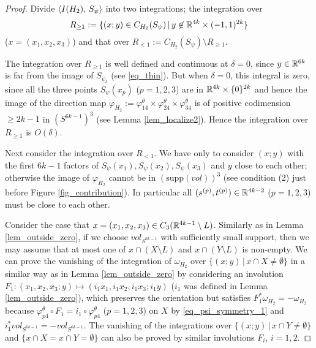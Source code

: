 \begin{proof}
Divide $\langle {I(H_2 )},\, {S_{\psi}}\rangle$ into two integrations;
the integration over
\[
 R_{\ge 1}:=\{ (x;y) \in C_{H_2}(S_{\psi}) \, | \, y \not\in \mathbb{R}^{4k}\times (-1,1)^{2k}\}
\]
($x=(x_1 ,x_2 ,x_3 )$) and that over $R_{<1}:=C_{H_2}(S_{\psi}) \setminus R_{\ge 1}$.


The integration over $R_{\ge 1}$ is well defined and continuous at $\delta =0$, since $y\in \mathbb{R}^{6k}$ is
far from the image of $S_{\psi_{\delta}}$ (see \eqref{eq_thin}).
But when $\delta =0$, this integral is zero, since all the three points $S_{\psi}(x_p )$ ($p=1,2,3$) are in
$\mathbb{R}^{4k}\times \{ 0 \}^{2k}$ and hence the image of the direction map
$\varphi_{H_2}:=\varphi^{\theta}_{14}\times \varphi^{\theta}_{24}\times \varphi^{\theta}_{34}$ is of positive codimension
$\ge 2k-1$ in $(S^{6k-1})^3$ (see Lemma \ref{lem_localize2}).
Hence the integration over $R_{\ge 1}$ is $O(\delta )$.


Next consider the integration over $R_{<1}$.
We have only to consider $(x;y)$ with the first $6k-1$ factors of $S_{\psi}(x_1 ),S_{\psi}(x_2 ),S_{\psi}(x_3 )$ and $y$
close to each other; otherwise the image of $\varphi_{H_2}$ cannot be in $(\text{supp}(vol))^3$ (see condition (2) just
before Figure \ref{fig_contribution}).
In particular all $(s^{(p)},t^{(p)})\in \mathbb{R}^{4k-2}$ ($p=1,2,3$) must be close to each other.


Consider the case that $x=(x_1 ,x_2 ,x_3 )\in C_3 (\mathbb{R}^{4k-1}\setminus L)$.
Similarly as in Lemma \ref{lem_outside_zero}, if we choose $vol_{S^{6k-1}}$ with sufficiently small support, then we
may assume that at most one of $x\cap (X\setminus L)$ and $x\cap (Y\setminus L)$ is non-empty.
We can prove the vanishing of the integration of $\omega_{H_2}$ over $\{ (x;y) \,| \, x \cap X \ne \emptyset \}$ in a
similar way as in Lemma \ref{lem_outside_zero} by considering an involution
$F_1 : (x_1 ,x_2 ,x_3 ;y)\mapsto (i_1 x_1 ,i_1 x_2 ,i_1 x_3 ;i_1 y)$ ($i_1$ was defined in Lemma
\ref{lem_outside_zero}), which preserves the orientation but satisfies $F^*_1 \omega_{H_2}=-\omega_{H_2}$ because
$\varphi^{\theta}_{p4} \circ F_1 = i_1 \circ \varphi^{\theta}_{p4}$ ($p=1,2,3$) on $X$ by \eqref{eq_psi_symmetry_1} and
$i^*_1 vol_{S^{6k-1}}=-vol_{S^{6k-1}}$.
The vanishing of the integrations over $\{ (x;y) \,| \, x \cap Y \ne \emptyset \}$ and
$\{ x\cap X = x\cap Y=\emptyset \}$ can also be proved by similar involutions $F_i$, $i=1,2$.



\end{proof}

